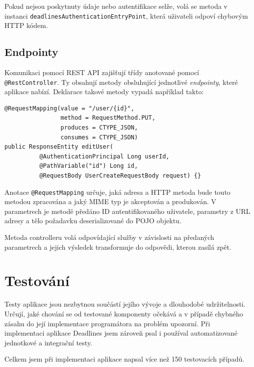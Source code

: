 \documentclass[thesis=B,czech]{FITthesis}[2012/06/26]
\begin{document}
		Pokud nejsou poskytnuty údaje nebo autentifikace selže, volá se metoda v instanci \texttt{deadlinesAuthenticationEntryPoint}, která uživateli odpoví chybovým HTTP kódem.
	
	\section{Endpointy}
		Komunikaci pomocí REST API zajišťují třídy anotované pomocí \texttt{@RestController}. Ty obsahují metody obsluhující jednotlivé \textit{endpointy}, které aplikace nabízí. Deklarace takové metody vypadá například takto:
		\begin{Verbatim}
@RequestMapping(value = "/user/{id}", 
                method = RequestMethod.PUT, 
                produces = CTYPE_JSON, 
                consumes = CTYPE_JSON)
public ResponseEntity editUser(
          @AuthenticationPrincipal Long userId,
          @PathVariable("id") Long id,
          @RequestBody UserCreateRequestBody request) {}
		\end{Verbatim}
	
	Anotace \texttt{@RequestMapping} určuje, jaká adresa a HTTP metoda bude touto metodou zpracována a jaký MIME typ \cite{mime-type} je akceptován a produkován. V parametrech je metodě předáno ID autentifikovaného uživatele, parametry z URL adresy a tělo požadavku deserializované do POJO objektu. 
	
	Metoda controlleru volá odpovídající služby v závislosti na předaných parametrech a jejich výsledek transformuje do odpovědi, kterou zasílá zpět.
	


\chapter{Testování}
	\label{chapter:testing}
	
	Testy aplikace jsou nezbytnou součástí jejího vývoje a dlouhodobé udržitelnosti. Určují, jaké chování se od testované komponenty očekává a v případě chybného zásahu do její implementace programátora na problém upozorní. Při implementaci aplikace Deadlines jsem zároveň psal i používal automatizované jednotkové a integrační testy. 
	
	Celkem jsem při implementaci aplikace napsal více než 150 testovacích případů. %
\end{document}
